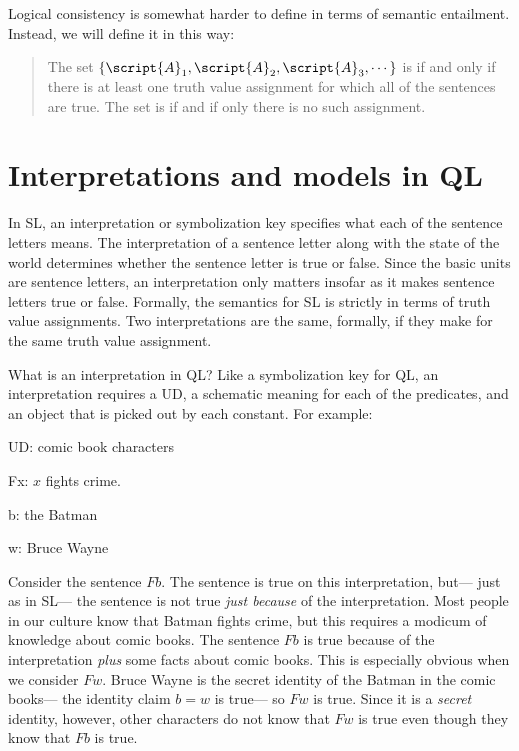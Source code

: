 Logical consistency is somewhat harder to define in terms of semantic entailment. Instead, we will define it in this way:

\begin{quote}
\label{def.consistencySL}
The set $\{\script{A}_1,\script{A}_2,\script{A}_3,\cdots\}$ is  if and only if there is at least one truth value assignment for which all of the sentences are true. The set is  if and if only there is no such assignment.
\end{quote}

\section{Interpretations and models in QL}

In SL, an interpretation or symbolization key specifies what each of the sentence letters means. The interpretation of a sentence letter along with the state of the world determines whether the sentence letter is true or false.
Since the basic units are sentence letters, an interpretation only matters insofar as it makes sentence letters true or false. Formally, the semantics for SL is strictly in terms of truth value assignments. Two interpretations are the same, formally, if they make for the same truth value assignment.

What is an interpretation in QL? Like a symbolization key for QL, an interpretation requires a UD, a schematic meaning for each of the predicates, and an object that is picked out by each constant. For example:
\begin{ekey}
\item[UD:] comic book characters
\item[Fx:] $x$ fights crime.
\item[b:] the Batman
\item[w:] Bruce Wayne
\end{ekey}
Consider the sentence $Fb$. The sentence is true on this interpretation, but--- just as in SL--- the sentence is not true \emph{just because} of the interpretation. Most people in our culture know that Batman fights crime, but this requires a modicum of knowledge about comic books. The sentence $Fb$ is true because of the interpretation \emph{plus} some facts about comic books. This is especially obvious when we consider $Fw$. Bruce Wayne is the secret identity of the Batman in the comic books--- the identity claim $b=w$ is true--- so $Fw$ is true. Since it is a \emph{secret} identity, however, other characters do not know that $Fw$ is true even though they know that $Fb$ is true.

